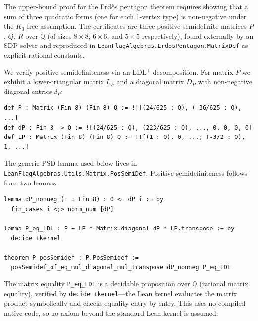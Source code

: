\documentclass{article}
\newcommand{\Q}{\mathbb{Q}}
\newcommand{\lean}[1]{\texttt{#1}}
\begin{document}
The upper-bound proof for the Erd\H{o}s pentagon theorem requires showing
that a sum of three quadratic forms (one for each 1-vertex type) is
non-negative under the $K_3$-free assumption.  The certificates are three
positive semidefinite matrices $P$, $Q$, $R$ over $\Q$ (of sizes
$8 \times 8$, $6 \times 6$, and $5 \times 5$ respectively), found
externally by an SDP solver and reproduced in
\lean{LeanFlagAlgebras.ErdosPentagon.MatrixDef} as explicit rational
constants.

We verify positive semidefiniteness via an LDL$^\top$ decomposition.  For
matrix $P$ we exhibit a lower-triangular matrix $L_P$ and a diagonal matrix
$D_P$ with non-negative diagonal entries $d_P$:
\begin{lstlisting}
def P : Matrix (Fin 8) (Fin 8) Q := !![(24/625 : Q), (-36/625 : Q), ...]
def dP : Fin 8 -> Q := ![(24/625 : Q), (223/625 : Q), ..., 0, 0, 0, 0]
def LP : Matrix (Fin 8) (Fin 8) Q := !![(1 : Q), 0, ...; (-3/2 : Q), 1, ...]
\end{lstlisting}
The generic PSD lemma used below lives in
\lean{LeanFlagAlgebras.Utils.Matrix.PosSemiDef}.  Positive semidefiniteness
follows from two lemmas:
\begin{lstlisting}
lemma dP_nonneg (i : Fin 8) : 0 <= dP i := by
  fin_cases i <;> norm_num [dP]

lemma P_eq_LDL : P = LP * Matrix.diagonal dP * LP.transpose := by
  decide +kernel

theorem P_posSemidef : P.PosSemidef :=
  posSemidef_of_eq_mul_diagonal_mul_transpose dP_nonneg P_eq_LDL
\end{lstlisting}
The matrix equality \lean{P\_eq\_LDL} is a decidable proposition over $\Q$
(rational matrix equality), verified by \lean{decide +kernel}---the Lean
kernel evaluates the matrix product symbolically and checks equality entry
by entry.  This uses no compiled native code, so no axiom beyond the standard
Lean kernel is assumed.
\end{document}
